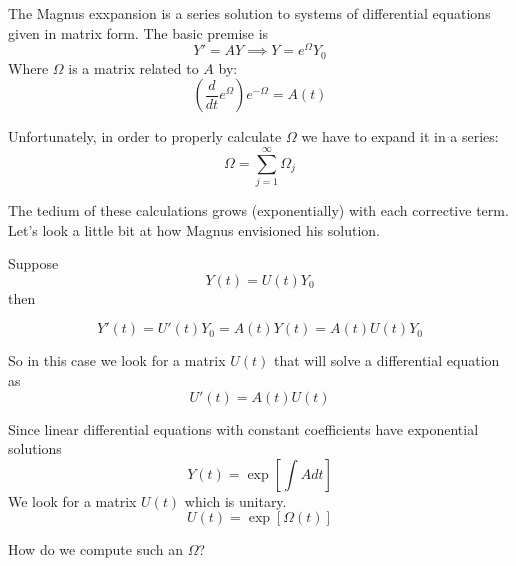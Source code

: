 \documentclass{amsart}
\theoremstyle{definition}
\theoremstyle{remark}
\numberwithin{equation}{section}
\begin{document}
The Magnus exxpansion is a series solution to systems of differential equations given in matrix form. The basic premise is
\[
Y' = AY \implies Y = e^{\Omega}Y_0
\]
Where $\Omega$ is a matrix related to $A$ by:
\[
\left(\frac{d}{dt}e^{\Omega}\right)e^{-\Omega} = A(t)
\]


Unfortunately, in order to properly calculate $\Omega$ we have to expand it in a series:
\[
\Omega = \sum_{j=1}^{\infty} \Omega_j
\]

The tedium of these calculations grows (exponentially) with each corrective term.  Let's look a little bit at how Magnus envisioned his solution.

Suppose 
\[
Y(t) = U(t)Y_0
\]
then

\[
Y'(t) = U'(t)Y_0 = A(t)Y(t) = A(t)U(t)Y_0
\]

So in this case we look for a matrix $U(t)$ that will solve a differential equation as 
\[
U'(t) = A(t)U(t)
\]

Since linear differential equations with constant coefficients have exponential solutions
\[
Y(t) = \exp\left[\int A dt\right]
\]
We look for a matrix $U(t)$ which is unitary.
\[
U(t) = \exp\left[\Omega(t)\right]
\]

How do we compute such an $\Omega$? 
\end{document}
